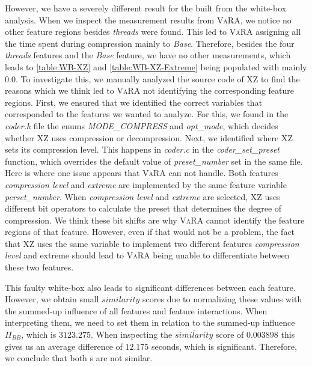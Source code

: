 However, we have a severely different result for the {\perfInfluenceModel} built from the white-box analysis. 
When we inspect the measurement results from \textsc{VaRA}, we notice no other feature regions besides \emph{threads} were found. 
This led to \textsc{VaRA} assigning all the time spent during compression mainly to \emph{Base}. 
Therefore, besides the four \emph{threads} features and the \emph{Base} feature, we have no other measurements,  
which leads to \autoref{table:WB-XZ} and \autoref{table:WB-XZ-Extreme} being populated with mainly $0.0$. 
To investigate this, we manually analyzed the source code of \textsc{XZ} to find the reasons which we think led to \textsc{VaRA} 
not identifying the corresponding feature regions. 
First, we ensured that we identified the correct variables that corresponded to the features we wanted to analyze. 
For this, we found in the \emph{coder.h} file the enums \emph{MODE\_COMPRESS} and \emph{opt\_mode}, 
which decides whether \textsc{XZ} uses compression or decompression. 
%
Next, we identified where \textsc{XZ} sets its compression level. 
This happens in \emph{coder.c} in the \emph{coder\_set\_preset} function, 
which overrides the default value of \emph{preset\_number} set in the same file. 
Here is where one issue appears that \textsc{VaRA} can not handle. 
Both features \emph{compression level} and \emph{extreme} are implemented by the same feature variable \emph{perset\_number}. 
When \emph{compression level} and \emph{extreme} are selected, \textsc{XZ} uses different bit operators to calculate the preset that determines 
the degree of compression. We think these bit shifts are why \textsc{VaRA} cannot identify the feature regions of that feature. 
However, even if that would not be a problem, the fact that \textsc{XZ} uses the same variable to implement two different features 
\emph{compression level} and extreme should lead to \textsc{VaRA} being unable to differentiate between these two features.

This faulty white-box {\perfInfluenceModel} also leads to significant differences between each feature. 
However, we obtain small $similarity$ scores due to normalizing these values with the summed-up influence of all features and feature interactions. 
When interpreting them, we need to set them in relation to the summed-up influence $\Pi_{BB}$, which is $3123.275$. 
When inspecting the $\overline{similarity}$ score of $0.003898$ this gives us an average difference of $12.175$ seconds, which is significant. 
Therefore, we conclude that both {\perfInfluenceModel}s are not similar.


